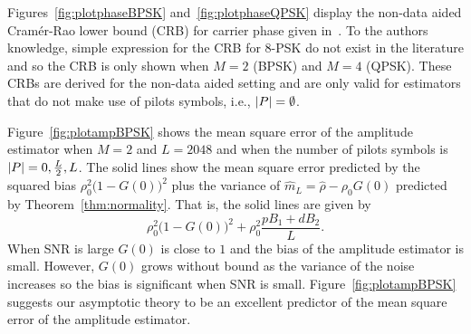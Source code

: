 \documentclass[journal]{IEEEtran}
\begin{document}
Figures~\ref{fig:plotphaseBPSK} and~\ref{fig:plotphaseQPSK} display the non-data aided Cram\'{e}r-Rao lower bound (CRB) for carrier phase given in~\cite{Cowley_crbs_phase_freq_1996}.  To the authors knowledge, simple expression for the CRB for $8$-PSK do not exist in the literature and so the CRB is only shown when $M=2$ (BPSK) and $M=4$ (QPSK).  These CRBs are derived for the non-data aided setting and are only valid for estimators that do not make use of pilots symbols, i.e., ${\left\vert P \right\vert}=\emptyset$.


Figure~\ref{fig:plotampBPSK} %
shows the mean square error of the amplitude estimator when $M=2$ and $L=2048$ and when the number of pilots symbols is ${\left\vert P \right\vert} = 0, \tfrac{L}{2}, L$.  The solid lines show the mean square error predicted by the squared bias $\rho_0^2\big(1 - G(0)\big)^2$ plus the variance of $\hat{m}_L = \hat{\rho} - \rho_0G(0)$ predicted by Theorem~\ref{thm:normality}.  That is, the solid lines are given by
\[
\rho_0^2\big(1 - G(0)\big)^2 + \rho_0^2\frac{p B_1 + d B_2}{L}. 
\]
When SNR is large $G(0)$ is close to $1$ and the bias of the amplitude estimator is small.  However, $G(0)$ grows without bound as the variance of the noise increases so the bias is significant when SNR is small.  Figure~\ref{fig:plotampBPSK} suggests our asymptotic theory to be an excellent predictor of the mean square error of the amplitude estimator.
\end{document}
